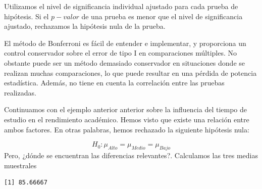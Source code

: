 \documentclass[
  letterpaper,
  DIV=11,
  numbers=noendperiod]{scrreprt}
\newenvironment{Shaded}{\begin{snugshade}}{\end{snugshade}}
\newcommand{\FunctionTok}[1]{\textcolor[rgb]{0.28,0.35,0.67}{#1}}
\newcommand{\NormalTok}[1]{\textcolor[rgb]{0.00,0.23,0.31}{#1}}
\newcommand{\SpecialCharTok}[1]{\textcolor[rgb]{0.37,0.37,0.37}{#1}}
\newcommand{\StringTok}[1]{\textcolor[rgb]{0.13,0.47,0.30}{#1}}
\begin{document}
Utilizamos el nivel de significancia individual ajustado para cada
prueba de hipótesis. Si el \(p-valor\) de una prueba es menor que el
nivel de significancia ajustado, rechazamos la hipótesis nula de la
prueba.

El método de Bonferroni es fácil de entender e implementar, y
proporciona un control conservador sobre el error de tipo I en
comparaciones múltiples. No obstante puede ser un método demasiado
conservador en situaciones donde se realizan muchas comparaciones, lo
que puede resultar en una pérdida de potencia estadística. Además, no
tiene en cuenta la correlación entre las pruebas realizadas.

\begin{tcolorbox}[enhanced jigsaw, arc=.35mm, breakable, coltitle=black, left=2mm, opacityback=0, bottomtitle=1mm, colbacktitle=quarto-callout-tip-color!10!white, title=\textcolor{quarto-callout-tip-color}{\faLightbulb}\hspace{0.5em}{Ejemplo. Comparaciones múltiples}, titlerule=0mm, colback=white, colframe=quarto-callout-tip-color-frame, bottomrule=.15mm, rightrule=.15mm, opacitybacktitle=0.6, toptitle=1mm, toprule=.15mm, leftrule=.75mm]

Continuamos con el ejemplo anterior anterior sobre la influencia del
tiempo de estudio en el rendimiento académico. Hemos visto que existe
una relación entre ambos factores. En otras palabras, hemos rechazado la
siguiente hipótesis nula:

\[
H_0: \mu_{Alto}=\mu_{Medio}=\mu_{Bajo}
\] Pero, ¿dónde se encuentran las diferencias relevantes?. Calculamos
las tres medias muestrales

\begin{Shaded}
\end{Shaded}

\begin{verbatim}
[1] 85.66667
\end{verbatim}

\begin{Shaded}
\end{Shaded}


\end{tcolorbox}
\end{document}
